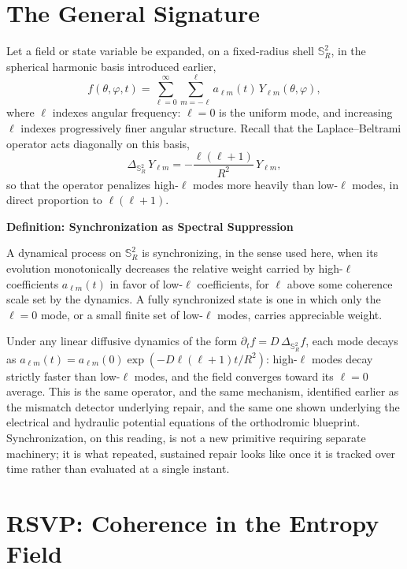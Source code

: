 \documentclass[11pt,fleqn]{book}
\numberwithin{equation}{chapter}
\newenvironment{definition}[1]
  {\begin{definitionEnv}
   \noindent\textbf{Definition: #1}\par\smallskip}
  {\end{definitionEnv}}
\theoremstyle{plain}
\theoremstyle{definition}
\theoremstyle{remark}
\newcommand{\Sphere}{\mathbb{S}^{2}}
\begin{document}
\section{The General Signature}

Let a field or state variable be expanded, on a fixed-radius shell \(\Sphere_R\), in the spherical harmonic basis introduced earlier,
\begin{equation}
f(\theta,\varphi,t) = \sum_{\ell=0}^{\infty}\sum_{m=-\ell}^{\ell} a_{\ell m}(t)\, Y_{\ell m}(\theta,\varphi),
\end{equation}
where \(\ell\) indexes angular frequency: \(\ell=0\) is the uniform mode, and increasing \(\ell\) indexes progressively finer angular structure. Recall that the Laplace--Beltrami operator acts diagonally on this basis,
\begin{equation}
\Delta_{\Sphere_R}\, Y_{\ell m} = -\frac{\ell(\ell+1)}{R^2}\, Y_{\ell m},
\end{equation}
so that the operator penalizes high-\(\ell\) modes more heavily than low-\(\ell\) modes, in direct proportion to \(\ell(\ell+1)\).

\begin{definition}{Synchronization as Spectral Suppression}
A dynamical process on \(\Sphere_R\) is synchronizing, in the sense used here, when its evolution monotonically decreases the relative weight carried by high-\(\ell\) coefficients \(a_{\ell m}(t)\) in favor of low-\(\ell\) coefficients, for \(\ell\) above some coherence scale set by the dynamics. A fully synchronized state is one in which only the \(\ell=0\) mode, or a small finite set of low-\(\ell\) modes, carries appreciable weight.
\end{definition}

Under any linear diffusive dynamics of the form \(\partial_t f = D\,\Delta_{\Sphere_R} f\), each mode decays as \(a_{\ell m}(t)=a_{\ell m}(0)\exp(-D\ell(\ell+1)t/R^2)\): high-\(\ell\) modes decay strictly faster than low-\(\ell\) modes, and the field converges toward its \(\ell=0\) average. This is the same operator, and the same mechanism, identified earlier as the mismatch detector underlying repair, and the same one shown underlying the electrical and hydraulic potential equations of the orthodromic blueprint. Synchronization, on this reading, is not a new primitive requiring separate machinery; it is what repeated, sustained repair looks like once it is tracked over time rather than evaluated at a single instant.

\section{RSVP: Coherence in the Entropy Field}
\end{document}
